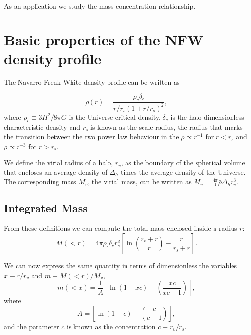 \documentclass[useAMS,usenatbib]{mn2e}
\begin{document}
As an application we study the mass concentration relationship.





\citep{NFW}


\section{Basic properties of the NFW density profile}
\label{sec:basics}

The Navarro-Frenk-White density profile can be written as

\begin{equation}
\rho(r) = \frac{\rho_c\delta_c}{r/r_s(1+r/r_s)^2}, 
\end{equation}
%
where $\rho_c\equiv 3H^2/8\pi G$ is the Universe critical density,
$\delta_c$ is the halo dimensionless characteristic density and $r_s$
is known as the scale radius, the radius that marks the transition
between the two power law behaviour in the $\rho\propto r^{-1}$ for
$r<r_s$ and $\rho\propto r^{-3}$ for  $r>r_s$.  

We define the virial radius of a halo, $r_v$, as the boundary of the
spherical volume that encloses an average density of $\Delta_h$ times
the average density of the Universe. The corresponding mass $M_{v}$,
the virial mass, can be written as $M_{v} =
\frac{4\pi}{3}\bar{\rho}\Delta_h r_v^3$. 


\subsection{Integrated Mass}
From these definitions we can compute the total mass enclosed inside a
radius $r$:
\begin{equation}
M(<r) = 4\pi\rho_c\delta_c  r_s^3\left[\ln \left
  (\frac{r_s+r}{r}\right) - \frac{r}{r_s+r}\right].
\end{equation}
 
We can now express the same quantity in terms of dimensionless the
variables $x\equiv r/r_v$ and $m\equiv M(<r)/M_v$,
%
\begin{equation}
m(<x) =
\frac{1}{A}\left[\ln\left(1+xc\right)-\left(\frac{xc}{xc+1}\right)\right],
\label{eq:profile}
\end{equation}
%
where 
%
\begin{equation}
A=\left[\ln\left(1+c\right)-\left(\frac{c}{c+1}\right)\right],
\end{equation}
%
and the parameter $c$ is known as the concentration $c\equiv r_v/r_s$.
\end{document}
